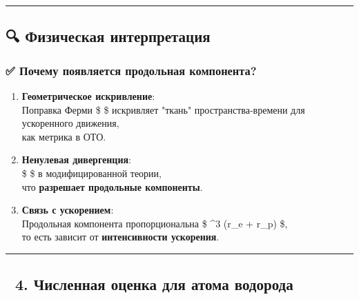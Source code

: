 \documentclass[11pt]{article}
\begin{document}
\begin{center}\rule{0.5\linewidth}{\linethickness}\end{center}

\subsection{🔍 Физическая
интерпретация}\label{ux444ux438ux437ux438ux447ux435ux441ux43aux430ux44f-ux438ux43dux442ux435ux440ux43fux440ux435ux442ux430ux446ux438ux44f}

\subsubsection{✅ Почему появляется продольная
компонента?}\label{ux43fux43eux447ux435ux43cux443-ux43fux43eux44fux432ux43bux44fux435ux442ux441ux44f-ux43fux440ux43eux434ux43eux43bux44cux43dux430ux44f-ux43aux43eux43cux43fux43eux43dux435ux43dux442ux430}

\begin{enumerate}
\def\labelenumi{\arabic{enumi}.}
\item
  \textbf{Геометрическое искривление}:\\
  Поправка Ферми \$  \$ искривляет "ткань"
  пространства-времени для ускоренного движения,\\
  как метрика в ОТО.
\item
  \textbf{Ненулевая дивергенция}:\\
  \$ \nabla \cdot {}  \$ в модифицированной теории,\\
  что \textbf{разрешает продольные компоненты}.
\item
  \textbf{Связь с ускорением}:\\
  Продольная компонента пропорциональна \$ \omega\^{}3 (r\_e + r\_p)
  \$,\\
  то есть зависит от \textbf{интенсивности ускорения}.
\end{enumerate}

\begin{center}\rule{0.5\linewidth}{\linethickness}\end{center}

\subsection{🔹 4. Численная оценка для атома
водорода}\label{ux447ux438ux441ux43bux435ux43dux43dux430ux44f-ux43eux446ux435ux43dux43aux430-ux434ux43bux44f-ux430ux442ux43eux43cux430-ux432ux43eux434ux43eux440ux43eux434ux430}
\end{document}
